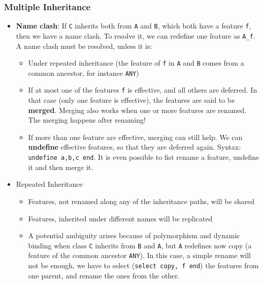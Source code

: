 \documentclass[a4paper]{article}
\newcommand{\inline}[1]{\lstinline!#1!}%
\begin{document}
\subsubsection{Multiple Inheritance}
\begin{itemize}
\item \textbf{Name clash}: If \inline{C} inherits both from \inline{A} and \inline{B}, which both have a feature \inline{f}, then we have a name clash. To resolve it, we can redefine one feature as \inline{A_f}. A name clash must be resolved, unless it is:
\begin{itemize}
\item Under repeated inheritance (the feature of \inline{f} in \inline{A} and \inline{B} comes from a common ancestor, for instance \inline{ANY})
\item If at most one of the features \inline{f} is effective, and all others are deferred. In that case (only one feature is effective), the features are said to be \textbf{merged}. Merging also works when one or more features are renamed. The merging happens after renaming!
\item If more than one feature are effective, merging can still help. We can \textbf{undefine} effective features, so that they are deferred again. Syntax: \inline{undefine a,b,c end}. It is even possible to fist rename a feature, undefine it and then merge it. 
\end{itemize}
\item Repeated Inheritance
\begin{itemize}
\item Features, not renamed along any of the inheritance paths, will be shared
\item Features, inherited under different names will be replicated
\item A potential ambiguity arises because of polymorphism and dynamic binding when class \inline{C} inherits from \inline{B} and \inline{A}, but \inline{A} redefines now copy (a feature of the common ancestor \inline{ANY}). In this case, a simple rename will not be enough, we have to select (\inline{select copy, f end}) the features from one parent, and rename the ones from the other.
\end{itemize}
\end{itemize}
\end{document}
